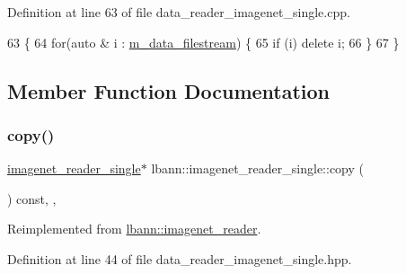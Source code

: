 Definition at line 63 of file data\+\_\+reader\+\_\+imagenet\+\_\+single.\+cpp.


\begin{DoxyCode}
63                                                 \{
64   \textcolor{keywordflow}{for}(\textcolor{keyword}{auto} & i : \hyperlink{classlbann_1_1imagenet__reader__single_af617e1b0b019049682db6de6e01b05ca}{m\_data\_filestream}) \{
65     \textcolor{keywordflow}{if} (i) \textcolor{keyword}{delete} i;
66   \}
67 \}
\end{DoxyCode}


\subsection{Member Function Documentation}
\mbox{\label{classlbann_1_1imagenet__reader__single_ac19ea9ae8887d86ef616099c2d93d699}} 
\subsubsection{\texorpdfstring{copy()}{copy()}}
{\footnotesize\ttfamily \hyperlink{classlbann_1_1imagenet__reader__single}{imagenet\+\_\+reader\+\_\+single}$\ast$ lbann\+::imagenet\+\_\+reader\+\_\+single\+::copy (\begin{DoxyParamCaption}{ }\end{DoxyParamCaption}) const\hspace{0.3cm}{\ttfamily [inline]}, {\ttfamily [override]}, {\ttfamily [virtual]}}



Reimplemented from \hyperlink{classlbann_1_1imagenet__reader_a71be5220be24de5caf00d2e422b750f2}{lbann\+::imagenet\+\_\+reader}.



Definition at line 44 of file data\+\_\+reader\+\_\+imagenet\+\_\+single.\+hpp.


